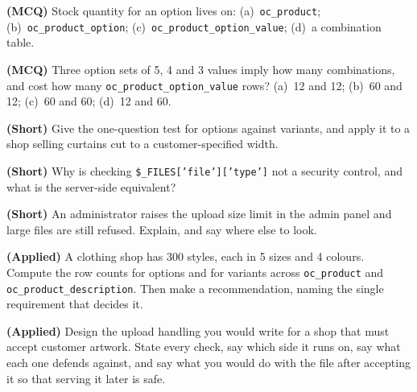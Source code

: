 \begin{reviewq}
  \item \textbf{(MCQ)} Stock quantity for an option lives on:
        (a)~\texttt{oc\_product}; (b)~\texttt{oc\_product\_option};
        (c)~\texttt{oc\_product\_option\_value}; (d)~a combination table.
  \item \textbf{(MCQ)} Three option sets of 5, 4 and 3 values imply how many
        combinations, and cost how many \texttt{oc\_product\_option\_value}
        rows? (a)~12 and 12; (b)~60 and 12; (c)~60 and 60; (d)~12 and 60.
  \item \textbf{(Short)} Give the one-question test for options against
        variants, and apply it to a shop selling curtains cut to a
        customer-specified width.
  \item \textbf{(Short)} Why is checking \texttt{\$\_FILES['file']['type']}
        not a security control, and what is the server-side equivalent?
  \item \textbf{(Short)} An administrator raises the upload size limit in the
        admin panel and large files are still refused. Explain, and say where
        else to look.
  \item \textbf{(Applied)} A clothing shop has 300 styles, each in 5 sizes and
        4 colours. Compute the row counts for options and for variants across
        \texttt{oc\_product} and \texttt{oc\_product\_description}. Then make a
        recommendation, naming the single requirement that decides it.
  \item \textbf{(Applied)} Design the upload handling you would write for a
        shop that must accept customer artwork. State every check, say which
        side it runs on, say what each one defends against, and say what you
        would do with the file after accepting it so that serving it later is
        safe.
\end{reviewq}
